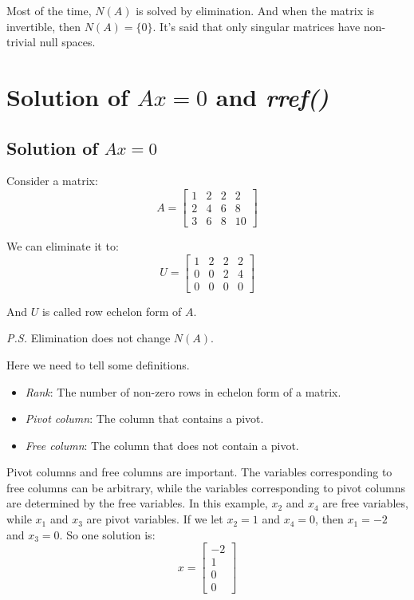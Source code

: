 \documentclass[10pt,a4paper,oneside,numbers=noenddot]{scrbook}
\theoremstyle{ctplain}
\theoremstyle{ctresult}
\begin{document}
Most of the time, $N(A)$ is solved by elimination. And when the matrix is invertible,
then $N(A) = \{0\}$. It's said that only singular matrices have non-trivial null
spaces.

\section{Solution of $Ax = 0$ and \textit{rref()}}
\subsection{Solution of $Ax = 0$}
Consider a matrix:
\[
  A = \begin{bmatrix}
    1 & 2 & 2 & 2 \\
    2 & 4 & 6 & 8 \\
    3 & 6 & 8 & 10
  \end{bmatrix}
\]

We can eliminate it to:
\[
  U = \begin{bmatrix}
    1 & 2 & 2 & 2 \\
    0 & 0 & 2 & 4 \\
    0 & 0 & 0 & 0
  \end{bmatrix}
\]

And $U$ is called row echelon form of $A$.

\vspace{0.5em}
\emph{P.S.} Elimination does not change $N(A)$.

Here we need to tell some definitions.
\begin{itemize}
  \item \emph{Rank}: The number of non-zero rows in echelon form of a matrix.
  \item \emph{Pivot column}: The column that contains a pivot.
  \item \emph{Free column}: The column that does not contain a pivot.
\end{itemize}

Pivot columns and free columns are important. The variables corresponding to free
columns can be arbitrary, while the variables corresponding to pivot columns are
determined by the free variables. In this example, $x_2$ and $x_4$ are free variables,
while $x_1$ and $x_3$ are pivot variables. If we let $x_2 = 1$ and $x_4 = 0$, then
$x_1 = -2$ and $x_3 = 0$. So one solution is:
\[
  x = \begin{bmatrix}
    -2 \\ 1 \\ 0 \\ 0
  \end{bmatrix}
\]
\end{document}
